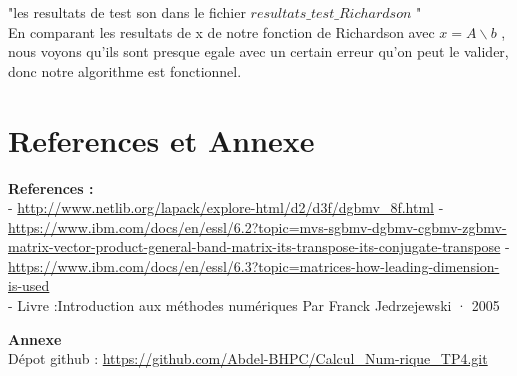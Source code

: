 \documentclass[12pt]{report}
\begin{document}
"les resultats de test son dans le fichier $resultats\_test\_Richardson$ "\\

En comparant les resultats de x de notre fonction de Richardson avec $x=A \backslash b$ , nous voyons qu'ils sont presque egale avec un certain erreur qu'on peut le valider, donc notre algorithme est fonctionnel.  

\newpage


\chapter{References et Annexe}

\textbf{\Large References :}\\
- \url{http://www.netlib.org/lapack/explore-html/d2/d3f/dgbmv_8f.html}
- \url{https://www.ibm.com/docs/en/essl/6.2?topic=mvs-sgbmv-dgbmv-cgbmv-zgbmv-matrix-vector-product-general-band-matrix-its-transpose-its-conjugate-transpose}
- \url{https://www.ibm.com/docs/en/essl/6.3?topic=matrices-how-leading-dimension-is-used}\\
- Livre :Introduction aux méthodes numériques Par Franck Jedrzejewski · 2005



\textbf{\Large Annexe}\\

Dépot github : \url{https://github.com/Abdel-BHPC/Calcul_Num-rique_TP4.git}
\end{document}
